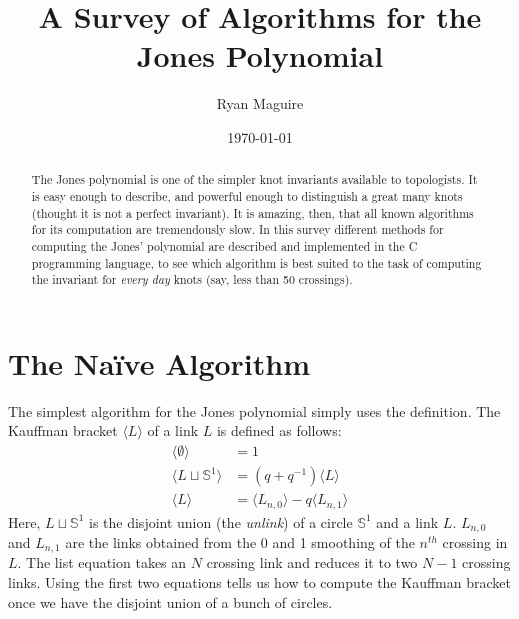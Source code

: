 \documentclass{article}
\title{A Survey of Algorithms for the Jones Polynomial}
\author{Ryan Maguire}
\date{\today}
\theoremstyle{plain}
\begin{document}
    \maketitle
    \begin{abstract}
        The Jones polynomial is one of the simpler knot invariants available
        to topologists. It is easy enough to describe, and powerful enough to
        distinguish a great many knots (thought it is not a perfect invariant).
        It is amazing, then, that all known algorithms for its computation are
        tremendously slow. In this survey different methods for computing the
        Jones' polynomial are described and implemented in the C programming
        language, to see which algorithm is best suited to the task of computing
        the invariant for \textit{every day} knots
        (say, less than 50 crossings).
    \end{abstract}
    \section{The Na\"{i}ve Algorithm}
        The simplest algorithm for the Jones polynomial simply uses the
        definition. The Kauffman bracket $\langle{L}\rangle$ of a link $L$ is
        defined as follows:
        \begin{align}
            \langle{\emptyset}\rangle&=1\\
            \langle{L\sqcup\mathbb{S}^{1}}\rangle&=(q+q^{-1})\langle{L}\rangle\\
            \langle{L}\rangle&=\langle{L_{n,0}}\rangle-q\langle{L_{n,1}}\rangle
        \end{align}
        Here, $L\sqcup\mathbb{S}^{1}$ is the disjoint union
        (the \textit{unlink}) of a circle $\mathbb{S}^{1}$ and a link $L$.
        $L_{n,0}$ and $L_{n,1}$ are the links obtained from the 0 and 1
        smoothing of the $n^{th}$ crossing in $L$. The list equation takes an
        $N$ crossing link and reduces it to two $N-1$ crossing links. Using
        the first two equations tells us how to compute the Kauffman bracket
        once we have the disjoint union of a bunch of circles.
\end{document}

